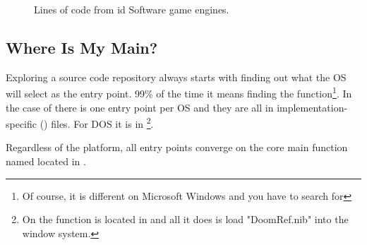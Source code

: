 \par
\begin{figure}[H]
\centering
   \caption{Lines of code from id Software game engines.}
 \end{figure}
\par

\subsection{Where Is My Main?}
Exploring a source code repository always starts with finding out what the OS will select as the entry point. 99\% of the time it means finding the  function\footnote{Of course, it is different on Microsoft Windows and you have to search for }. In the case of \doom{} there is one entry point per OS and they are all in implementation-specific () files. For DOS it is in \footnote{On \NeXT the  function is located in  and all it does is load "DoomRef.nib" into the window system.}.\\
\par
Regardless of the platform, all entry points converge on the core main function named  located in .\\ 
\par

